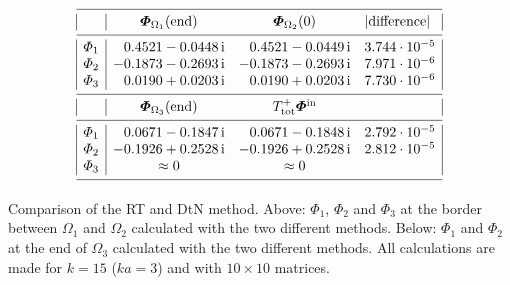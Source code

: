 \documentclass[numreferences]{kluwer}
\providecommand{\abs}[1]{\left\lvert#1\right\rvert}
\renewcommand{\Phi}{\varPhi}
\renewcommand{\vec}[1]{\bm{#1}}
\renewcommand{\i}{\,\mathrm{i}}
\renewcommand{\Phi}{\varPhi}
\newcommand{\Phiin}{\vec\Phi^{\text{in}}}
\newcommand{\Ttot}{T^+_{\text{tot}}}
\begin{document}

\begin{table}[ht]
  \begin{equation*}
    \begin{array}{|l|rrl|}
      \hline
      &\multicolumn1c{\vec\Phi_{\Omega_1}(\text{end})}
      &\multicolumn1c{\vec\Phi_{\Omega_2}(0)}
      &\abs{\text{difference}}\\
      \hline
      \Phi_1&0.4521-0.0448\i&0.4521-0.0449\i&3.744\cdot10^{-5}\\
      \Phi_2&-0.1873-0.2693\i&-0.1873-0.2693\i&7.971\cdot10^{-6}\\
      \Phi_3&0.0190+0.0203\i&0.0190+0.0203\i&7.730\cdot10^{-6}\\
      \hline
      &\multicolumn1c{\vec\Phi_{\Omega_3}(\text{end})}
      &\multicolumn1c{\Ttot\Phiin}
      &\\
      \hline
      \Phi_1&0.0671-0.1847\i&0.0671-0.1848\i&2.792\cdot10^{-5}\\
      \Phi_2&-0.1926+0.2528\i&-0.1926+0.2528\i&2.812\cdot10^{-5}\\
      \Phi_3&\multicolumn1c{\approx0}&\multicolumn1c{\approx0}&\\
      \hline
    \end{array}
  \end{equation*}
  \caption{Comparison of the RT and DtN method. Above: $\Phi_1$,
    $\Phi_2$ and $\Phi_3$ at the border between $\Omega_1$ and $\Omega_2$
    calculated with the two different methods. Below: $\Phi_1$ and
    $\Phi_2$ at the end of $\Omega_3$ calculated with the two
    different methods. All calculations are made for $k=15$ ($ka=3$)
    and with $10\times10$ matrices.}
  \label{tab:phires-bcend}
  \tabwidth{\textwidth}
\end{table}
\end{document}

